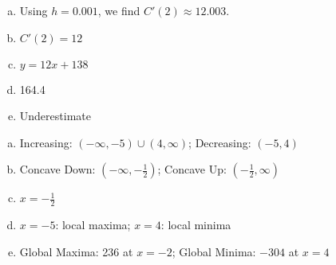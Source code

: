 \documentclass[11pt,letterpaper]{article}
\begin{document}
\newpage



\prob 
	\begin{enumerate}[(a)]
	\item Using $h= 0.001$, we find $C'(2) \approx 12.003$. 
	\item $C'(2)= 12$
	\item $y= 12x + 138$
	\item 164.4
	\item Underestimate
	\end{enumerate} \pvspace{1cm}



\prob 
	\begin{enumerate}[(a)]
	\item Increasing: $(-\infty, -5) \cup (4, \infty)$; Decreasing: $(-5, 4)$
	\item Concave Down: $(-\infty, -\frac{1}{2})$; Concave Up: $(-\frac{1}{2}, \infty)$
	\item $x= -\frac{1}{2}$
	\item $x= -5$: local maxima; $x= 4$: local minima
	\item Global Maxima: 236 at $x= -2$; Global Minima: $-304$ at $x= 4$
	\end{enumerate}
\end{document}
